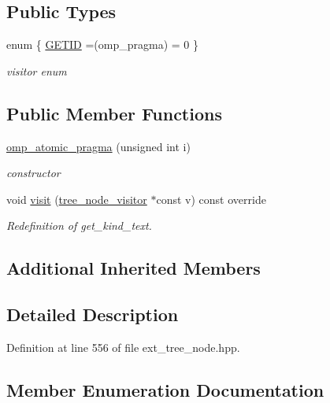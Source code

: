 \subsection*{Public Types}
\begin{DoxyCompactItemize}
\item 
enum \{ \hyperlink{structomp__atomic__pragma_a57513cdbeb4a59dae45b8effb61265b3a95836c18b5264ed1eae6af2cd2d93e4a}{G\+E\+T\+ID} =(omp\+\_\+pragma) = 0
 \}\begin{DoxyCompactList}\small\item\em visitor enum \end{DoxyCompactList}
\end{DoxyCompactItemize}
\subsection*{Public Member Functions}
\begin{DoxyCompactItemize}
\item 
\hyperlink{structomp__atomic__pragma_a2c78dee8e114b16af1d44a6a5ddd4940}{omp\+\_\+atomic\+\_\+pragma} (unsigned int i)
\begin{DoxyCompactList}\small\item\em constructor \end{DoxyCompactList}\item 
void \hyperlink{structomp__atomic__pragma_adf901941aa33c47235e3b20d17410f63}{visit} (\hyperlink{classtree__node__visitor}{tree\+\_\+node\+\_\+visitor} $\ast$const v) const override
\begin{DoxyCompactList}\small\item\em Redefinition of get\+\_\+kind\+\_\+text. \end{DoxyCompactList}\end{DoxyCompactItemize}
\subsection*{Additional Inherited Members}


\subsection{Detailed Description}


Definition at line 556 of file ext\+\_\+tree\+\_\+node.\+hpp.



\subsection{Member Enumeration Documentation}
\mbox{\label{structomp__atomic__pragma_a57513cdbeb4a59dae45b8effb61265b3}} 
